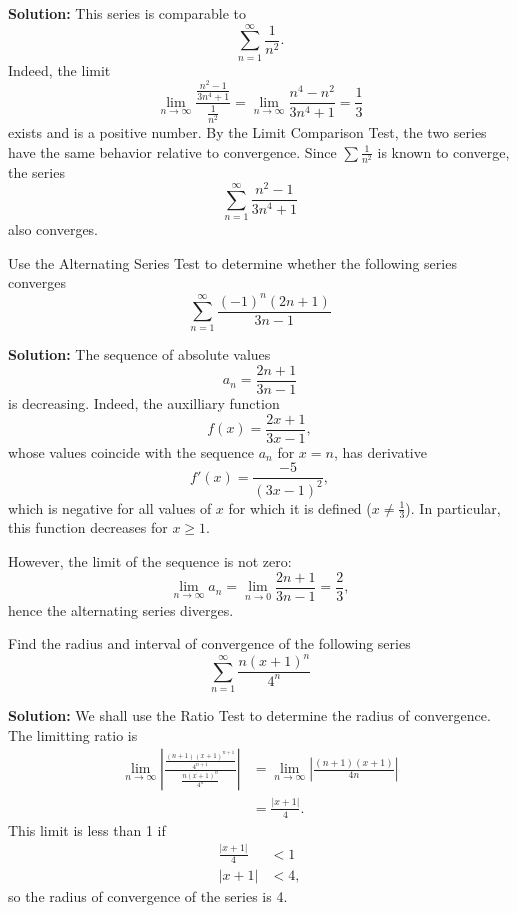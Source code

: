 \documentclass[11pt]{exam}
\begin{document}
\begin{questions}
\textbf{Solution:} This series is comparable to 
\begin{equation*}
\sum_{n=1}^{\infty} \frac{1}{n^2}.
\end{equation*}
Indeed, the limit 
\begin{equation*}
\lim_{n \to \infty} \frac{\frac{n^2-1}{3n^4+1}}{\frac{1}{n^2}} = \lim_{n \to \infty} \frac{n^4-n^2}{3n^4+1} =\frac{1}{3}
\end{equation*}
exists and is a positive number. By the Limit Comparison Test, the two series have the same behavior relative to convergence. Since $\sum \frac{1}{n^2}$ is known to converge, the series 
\begin{equation*}
\sum_{n=1}^{\infty} \frac{n^2-1}{3n^4+1}
\end{equation*}
also converges. 

\newpage
\addpoints 
\question[2] Use the Alternating Series Test to determine whether the following series converges
\begin{equation*}
\sum_{n=1}^{\infty} \frac{(-1)^n(2n+1)}{3n-1}
\end{equation*}

\textbf{Solution:} The sequence of absolute values
\begin{equation*}
a_n=\frac{2n+1}{3n-1}
\end{equation*} 
is decreasing. Indeed, the auxilliary function 
\begin{equation*}
f(x)=\frac{2x+1}{3x-1},
\end{equation*}
whose values coincide with the sequence $a_n$ for $x=n$, has derivative
\begin{equation*}
f'(x)=\frac{-5}{(3x-1)^2},
\end{equation*}
which is negative for all values of $x$ for which it is defined ($x\neq \frac{1}{3}$). In particular, this function decreases for $x\geq1$. 

However, the limit of the sequence is not zero:
\begin{equation*}
\lim_{n \to \infty} a_n = \lim_{n \to 0} \frac{2n+1}{3n-1}=\frac{2}{3},
\end{equation*}
hence the alternating series diverges. 

\newpage
\addpoints
\question[3] Find the radius and interval of convergence of the following series
\begin{equation*}
\sum_{n=1}^{\infty} \frac{n(x+1)^n}{4^n}
\end{equation*}

\textbf{Solution:} We shall use the Ratio Test to determine the radius of convergence. The limitting ratio is 
\begin{align*}
\lim_{n \to \infty} \left| \frac{\frac{(n+1)(x+1)^{n+1}}{4^{n+1}}}{\frac{n(x+1)^n}{4^n}} \right| & = \lim_{n \to \infty} \left|\frac{(n+1)(x+1)}{4n} \right| \\
& = \frac{|x+1|}{4}.
\end{align*}
This limit is less than 1 if 
\begin{align*}
\frac{|x+1|}{4} & < 1 \\
|x+1| & < 4,
\end{align*}
so the radius of convergence of the series is 4. 


\end{questions}
\end{document}
